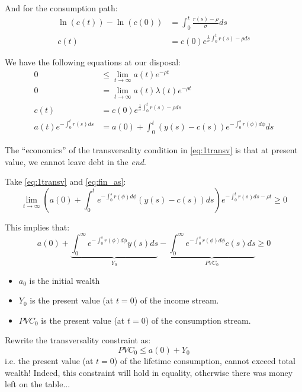 \documentclass[aspectratio=169]{beamer}
\begin{document}
\begin{frame}
    And for the consumption path:
    \begin{align*}
        \ln(c(t))-\ln(c(0))&=\int_0^t \frac{r(s)-\rho}{\sigma}ds\\
        c(t)&=c(0)e^{\frac{1}{\sigma}\int_0^t r(s)-\rho ds}
    \end{align*}
\end{frame}

\begin{frame}
    We have the following equations at our disposal:
    \begin{align}
        0&\leq\lim_{t\rightarrow\infty} a(t)e^{-\rho t}\label{eq:1transv}\\
        0&=\lim_{t\rightarrow\infty} a(t)\lambda(t)e^{-\rho t}\label{eq:2transv}\\
        c(t)&=c(0)e^{\frac{1}{\sigma}\int_0^t r(s)-\rho ds}\label{eq:fin_con}\\
        a(t)e^{-\int_0^t r(s)ds}&=a(0)+\int_0^t(y(s)-c(s))e^{-\int_0^s r(\phi)d\phi}ds\label{eq:fin_as}
    \end{align}
    
    The ``economics'' of the transversality condition in \eqref{eq:1transv} is that at present value, we cannot leave debt in the \emph{end}.
\end{frame}

\begin{frame}
    
    Take \eqref{eq:1transv} and \eqref{eq:fin_as}:
    \[\lim_{t\rightarrow\infty}\left(a(0)+\int_0^t e^{-\int_0^sr(\phi)d\phi} (y(s)-c(s))ds\right)e^{-\int_0^tr(s)ds-\rho t}\geq 0\]
    
    This implies that:
    \[a(0)+\underbrace{\int_0^\infty e^{-\int_0^sr(\phi)d\phi}y(s)ds}_{Y_0} - \underbrace{\int_0^\infty e^{-\int_0^sr(\phi)d\phi}c(s)ds}_{PVC_0}\geq0\]
    \begin{itemize}
        \item $a_0$ is the initial wealth
        \item $Y_0$ is the present value (at $t=0$) of the income stream.
        \item $PVC_0$ is the present value (at $t=0$) of the consumption stream.
    \end{itemize}
\end{frame}

\begin{frame}
    Rewrite the transversality constraint as:
    \[PVC_0\leq a(0)+Y_0\]
    i.e. the present value (at $t=0$) of the lifetime consumption, cannot exceed total wealth! Indeed, this constraint will hold in equality, otherwise there was money left on the table...
\end{frame}
\end{document}
